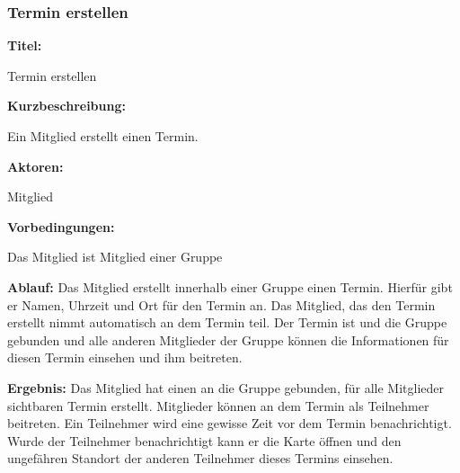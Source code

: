 \documentclass{scrartcl}
\begin{document}
	\subsubsection{Termin erstellen}
	\begin{description}
		\item \textbf{Titel:}
		\begin{description}
			\item Termin erstellen
		\end{description}
		\item \textbf{Kurzbeschreibung:}
		\begin{description}
			\item Ein Mitglied erstellt einen Termin.
		\end{description}
		\item \textbf{Aktoren:}
		\begin{description}
			\item \gls{Mitglied}
		\end{description}
		\item \textbf{Vorbedingungen:}
		\begin{description}
			\item Das Mitglied ist Mitglied einer Gruppe
		\end{description}
		\item \textbf{Ablauf:} \newline Das Mitglied erstellt innerhalb einer Gruppe einen Termin. Hierfür gibt er Namen, Uhrzeit und Ort für den Termin an. Das Mitglied, das den Termin erstellt nimmt automatisch an dem Termin teil. Der Termin ist und die Gruppe gebunden und alle anderen Mitglieder der Gruppe können die Informationen für diesen Termin einsehen und ihm beitreten.
		\item \textbf{Ergebnis:} \newline Das Mitglied hat einen an die Gruppe gebunden, für alle Mitglieder sichtbaren Termin erstellt. Mitglieder können an dem Termin als \gls{Teilnehmer} beitreten. Ein Teilnehmer wird eine gewisse Zeit vor dem Termin benachrichtigt. Wurde der Teilnehmer benachrichtigt kann er die Karte öffnen und den ungefähren Standort der anderen Teilnehmer dieses Termins einsehen.
	\end{description}
	
	\newpage
	
\end{document}
